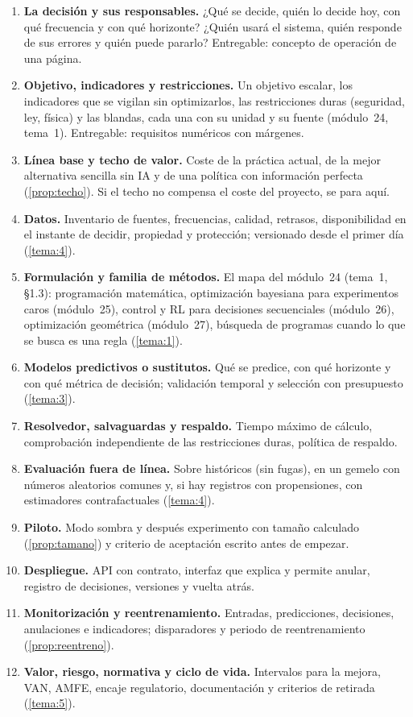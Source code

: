 \begin{enumerate}[label=\textbf{\arabic*.},leftmargin=1.6em]
  \item \textbf{La decisión y sus responsables.} ¿Qué se decide, quién lo decide hoy, con qué frecuencia y con qué horizonte? ¿Quién usará el sistema, quién responde de sus errores y quién puede pararlo? Entregable: concepto de operación de una página.
  \item \textbf{Objetivo, indicadores y restricciones.} Un objetivo escalar, los indicadores que se vigilan sin optimizarlos, las restricciones duras (seguridad, ley, física) y las blandas, cada una con su unidad y su fuente (módulo~24, tema~1). Entregable: requisitos numéricos con márgenes.
  \item \textbf{Línea base y techo de valor.} Coste de la práctica actual, de la mejor alternativa sencilla sin IA y de una política con información perfecta (\cref{prop:techo}). Si el techo no compensa el coste del proyecto, se para aquí.
  \item \textbf{Datos.} Inventario de fuentes, frecuencias, calidad, retrasos, disponibilidad en el instante de decidir, propiedad y protección; versionado desde el primer día (\cref{tema:4}).
  \item \textbf{Formulación y familia de métodos.} El mapa del módulo~24 (tema~1, §1.3): programación matemática, optimización bayesiana para experimentos caros (módulo~25), control y RL para decisiones secuenciales (módulo~26), optimización geométrica (módulo~27), búsqueda de programas cuando lo que se busca es una regla (\cref{tema:1}).
  \item \textbf{Modelos predictivos o sustitutos.} Qué se predice, con qué horizonte y con qué métrica de decisión; validación temporal y selección con presupuesto (\cref{tema:3}).
  \item \textbf{Resolvedor, salvaguardas y respaldo.} Tiempo máximo de cálculo, comprobación independiente de las restricciones duras, política de respaldo.
  \item \textbf{Evaluación fuera de línea.} Sobre históricos (sin fugas), en un gemelo con números aleatorios comunes y, si hay registros con propensiones, con estimadores contrafactuales (\cref{tema:4}).
  \item \textbf{Piloto.} Modo sombra y después experimento con tamaño calculado (\cref{prop:tamano}) y criterio de aceptación escrito antes de empezar.
  \item \textbf{Despliegue.} API con contrato, interfaz que explica y permite anular, registro de decisiones, versiones y vuelta atrás.
  \item \textbf{Monitorización y reentrenamiento.} Entradas, predicciones, decisiones, anulaciones e indicadores; disparadores y periodo de reentrenamiento (\cref{prop:reentreno}).
  \item \textbf{Valor, riesgo, normativa y ciclo de vida.} Intervalos para la mejora, VAN, AMFE, encaje regulatorio, documentación y criterios de retirada (\cref{tema:5}).
\end{enumerate}

